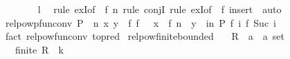 \begin{isabellebody}
\ \ \ \ \ \ \isamarkupfalse%
\ {\isacharquery}{\kern0pt}l\ \isamarkupfalse%
\ {\isacharparenleft}{\kern0pt}rule\ exI{\isacharbrackleft}{\kern0pt}of\ {\isacharunderscore}{\kern0pt}\ {\isachardoublequoteopen}f\ n{\isachardoublequoteclose}{\isacharbrackright}{\kern0pt}{\isacharcomma}{\kern0pt}\ rule\ conjI{\isacharcomma}{\kern0pt}\ rule\ exI{\isacharbrackleft}{\kern0pt}of\ {\isacharunderscore}{\kern0pt}\ f{\isacharbrackright}{\kern0pt}{\isacharcomma}{\kern0pt}\ insert\ {}{\isacharcomma}{\kern0pt}\ auto{\isacharparenright}{\kern0pt}\isanewline
\ \ \ \ \isamarkupfalse%
\isanewline
\ \ \isamarkupfalse%
\isanewline
{}\isamarkupfalse%
%
\endisatagproof
{\isafoldproof}%
%
\isadelimproof
\isanewline
%
\endisadelimproof
\isanewline
{}\isamarkupfalse%
\ relpowp{\isacharunderscore}{\kern0pt}fun{\isacharunderscore}{\kern0pt}conv{\isacharcolon}{\kern0pt}\ {\isachardoublequoteopen}{\isacharparenleft}{\kern0pt}P\ {\isacharcircum}{\kern0pt}{\isacharcircum}{\kern0pt}\ n{\isacharparenright}{\kern0pt}\ x\ y\ {\isasymlongleftrightarrow}\ {\isacharparenleft}{\kern0pt}{\isasymexists}f{\isachardot}{\kern0pt}\ f\ {}\ {\isacharequal}{\kern0pt}\ x\ {\isasymand}\ f\ n\ {\isacharequal}{\kern0pt}\ y\ {\isasymand}\ {\isacharparenleft}{\kern0pt}{\isasymforall}i{\isacharless}{\kern0pt}n{\isachardot}{\kern0pt}\ P\ {\isacharparenleft}{\kern0pt}f\ i{\isacharparenright}{\kern0pt}\ {\isacharparenleft}{\kern0pt}f\ {\isacharparenleft}{\kern0pt}Suc\ i{\isacharparenright}{\kern0pt}{\isacharparenright}{\kern0pt}{\isacharparenright}{\kern0pt}{\isacharparenright}{\kern0pt}{\isachardoublequoteclose}\isanewline
%
\isadelimproof
\ \ %
\endisadelimproof
%
\isatagproof
{}\isamarkupfalse%
\ {\isacharparenleft}{\kern0pt}fact\ relpow{\isacharunderscore}{\kern0pt}fun{\isacharunderscore}{\kern0pt}conv\ {\isacharbrackleft}{\kern0pt}to{\isacharunderscore}{\kern0pt}pred{\isacharbrackright}{\kern0pt}{\isacharparenright}{\kern0pt}%
\endisatagproof
{\isafoldproof}%
%
\isadelimproof
\isanewline
%
\endisadelimproof
\isanewline
{}\isamarkupfalse%
\ relpow{\isacharunderscore}{\kern0pt}finite{\isacharunderscore}{\kern0pt}bounded{}{\isacharcolon}{\kern0pt}\isanewline
\ \ \ R\ {\isacharcolon}{\kern0pt}{\isacharcolon}{\kern0pt}\ {\isachardoublequoteopen}{\isacharparenleft}{\kern0pt}{\isacharprime}{\kern0pt}a\ {\isasymtimes}\ {\isacharprime}{\kern0pt}a{\isacharparenright}{\kern0pt}\ set{\isachardoublequoteclose}\isanewline
\ \ \ {\isachardoublequoteopen}finite\ R{\isachardoublequoteclose}\ \ {\isachardoublequoteopen}k\ {\isachargreater}{\kern0pt}\ {}{\isachardoublequoteclose}\isanewline

\end{isabellebody}
